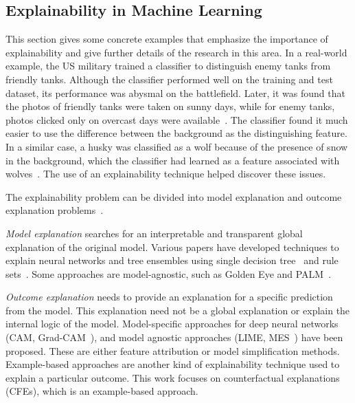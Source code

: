 \subsection{Explainability in Machine Learning}
This section gives some concrete examples that emphasize the importance of explainability and give further details of the research in this area. 
In a real-world example, the US military trained a classifier to distinguish enemy tanks from friendly tanks. Although the classifier performed well on the training and test dataset, its performance was abysmal on the battlefield. 
Later, it was found that the photos of friendly tanks were taken on sunny days, while for enemy tanks, photos clicked only on overcast days were available~\citep{xai-survey4}. 
The classifier found it much easier to use the difference between the background as the distinguishing feature. 
In a similar case, a husky was classified as a wolf because of the presence of snow in the background, which the classifier had learned as a feature associated with wolves~\citep{ribeiro_why_2016}. 
The use of an explainability technique helped discover these issues. 

The explainability problem can be divided into model explanation and outcome explanation problems~\citep{xai-survey4}. %

\emph{Model explanation} searches for an interpretable and transparent global explanation of the original model. 
Various papers have developed techniques to explain neural networks and tree ensembles using single decision tree~\citep{craven_exp1,KRISHNAN_exp2,Pedro_exp4} and rule sets~\citep{Deng_exp5,Andrews_exp6}.
Some approaches are model-agnostic, such as Golden Eye and  PALM~\citep{Andreas_exp7,Krishnan_exp8,Zien_exp9}. 

\emph{Outcome explanation} needs to provide an explanation for a specific prediction from the model. 
This explanation need not be a global explanation or explain the internal logic of the model. 
Model-specific approaches for deep neural networks (CAM, Grad-CAM~\citep{Khosla_cam,grad-cam}), and model agnostic approaches (LIME, MES~\citep{ribeiro_why_2016,Turner2016_MES}) have been proposed. 
These are either feature attribution or model simplification methods. 
Example-based approaches are another kind of explainability technique used to explain a particular outcome. 
This work focuses on counterfactual explanations (CFEs), which is an example-based approach. 

